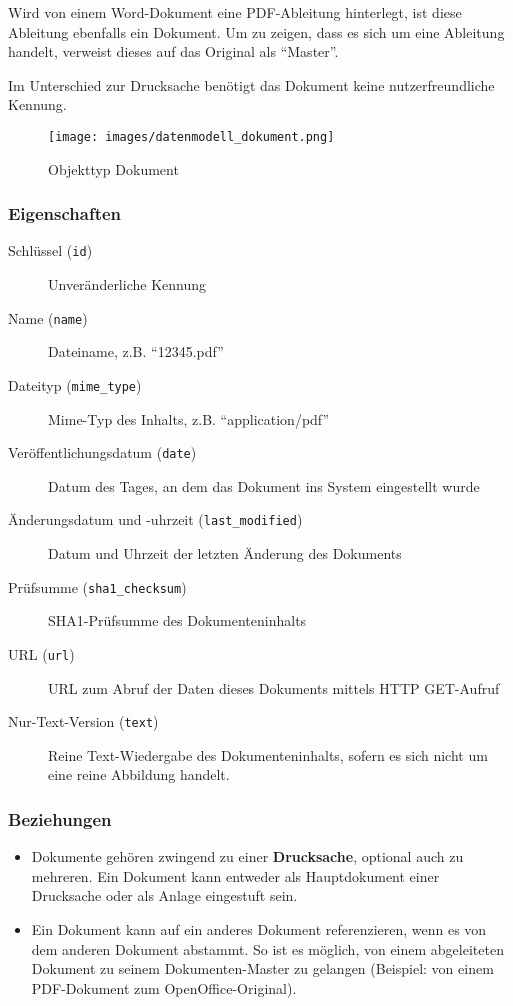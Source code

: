 \documentclass[,a4paper]{article}
\makeatletter
\def\maxwidth{\ifdim\Gin@nat@width>\linewidth\linewidth
\else\Gin@nat@width\fi}
\let\Oldincludegraphics\includegraphics
\renewcommand{\includegraphics}[1]{\Oldincludegraphics[width=\maxwidth]{#1}}
\makeatother
\begin{document}
Wird von einem Word-Dokument eine PDF-Ableitung hinterlegt, ist diese
Ableitung ebenfalls ein Dokument. Um zu zeigen, dass es sich um eine
Ableitung handelt, verweist dieses auf das Original als ``Master''.

Im Unterschied zur Drucksache benötigt das Dokument keine
nutzerfreundliche Kennung.

\begin{figure}[htbp]
\centering
\texttt{[image: images/datenmodell\_dokument.png]}
\caption{Objekttyp Dokument}
\end{figure}

\subsubsection{Eigenschaften}

\begin{description}
\item[Schlüssel (\texttt{id})]
Unveränderliche Kennung
\item[Name (\texttt{name})]
Dateiname, z.B. ``12345.pdf''
\item[Dateityp (\texttt{mime\_type})]
Mime-Typ des Inhalts, z.B. ``application/pdf''
\item[Veröffentlichungsdatum (\texttt{date})]
Datum des Tages, an dem das Dokument ins System eingestellt wurde
\item[Änderungsdatum und -uhrzeit (\texttt{last\_modified})]
Datum und Uhrzeit der letzten Änderung des Dokuments
\item[Prüfsumme (\texttt{sha1\_checksum})]
SHA1-Prüfsumme des Dokumenteninhalts
\item[URL (\texttt{url})]
URL zum Abruf der Daten dieses Dokuments mittels HTTP GET-Aufruf
\item[Nur-Text-Version (\texttt{text})]
Reine Text-Wiedergabe des Dokumenteninhalts, sofern es sich nicht um
eine reine Abbildung handelt.
\end{description}

\subsubsection{Beziehungen}

\begin{itemize}
\item
  Dokumente gehören zwingend zu einer \textbf{Drucksache}, optional auch
  zu mehreren. Ein Dokument kann entweder als Hauptdokument einer
  Drucksache oder als Anlage eingestuft sein.
\item
  Ein Dokument kann auf ein anderes Dokument referenzieren, wenn es von
  dem anderen Dokument abstammt. So ist es möglich, von einem
  abgeleiteten Dokument zu seinem Dokumenten-Master zu gelangen
  (Beispiel: von einem PDF-Dokument zum OpenOffice-Original).
\end{itemize}
\end{document}
